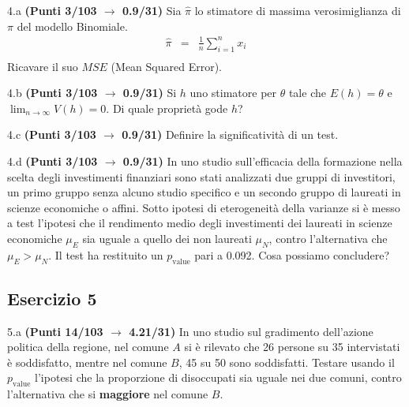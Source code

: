\documentclass[
  11pt,
]{book}
\theoremstyle{mytheoremstyle}
\theoremstyle{mydefstyle}
\begin{document}
4.a \textbf{(Punti 3/103 \(\rightarrow\) 0.9/31)} Sia \(\hat \pi\) lo stimatore di massima verosimiglianza di \(\pi\) del modello Binomiale.
\begin{eqnarray*}
  \hat\pi &=&  \frac 1n\sum_{i=1}^nx_i\\
\end{eqnarray*}
Ricavare il suo \(MSE\) (Mean Squared Error).

4.b \textbf{(Punti 3/103 \(\rightarrow\) 0.9/31)} Si \(h\) uno stimatore per \(\theta\) tale che \(E(h)=\theta\) e \(\lim_{n\to\infty} V(h)=0\). Di quale proprietà gode \(h\)?

4.c \textbf{(Punti 3/103 \(\rightarrow\) 0.9/31)} Definire la significatività di un test.

4.d \textbf{(Punti 3/103 \(\rightarrow\) 0.9/31)} In uno studio sull'efficacia della formazione nella scelta degli investimenti finanziari sono stati analizzati due gruppi di investitori, un primo gruppo senza alcuno studio specifico e un secondo gruppo di laureati in scienze economiche o affini. Sotto ipotesi di eterogeneità della varianze si è messo a test l'ipotesi che il rendimento medio degli investimenti dei laureati in scienze economiche \(\mu_E\) sia uguale a quello dei non laureati \(\mu_N\), contro l'alternativa che \(\mu_E>\mu_N\). Il test ha restituito un \(p_\text{value}\) pari a 0.092. Cosa possiamo concludere?

\subsection{Esercizio 5}\label{esercizio-5-18}

5.a \textbf{(Punti 14/103 \(\rightarrow\) 4.21/31)} In uno studio sul gradimento dell'azione politica della regione, nel comune \(A\) si è rilevato che 26 persone su 35 intervistati è soddisfatto, mentre nel comune \(B\), 45 su 50 sono soddisfatti.
Testare usando il \(p_\text{value}\) l'ipotesi che la proporzione di disoccupati sia uguale nei due comuni, contro l'alternativa che si \textbf{maggiore} nel comune \(B\).
\end{document}
